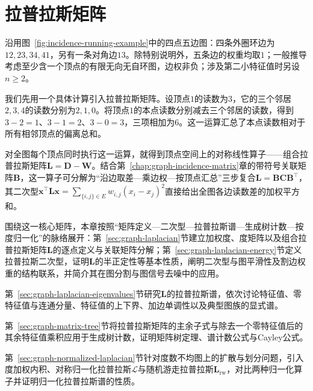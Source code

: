 \chapter{拉普拉斯矩阵}
\label{chap:graph-laplacian-matrix}

沿用图~\ref{fig:incidence-running-example}中的四点五边图：四条外圈环边为$12,23,34,41$，另有一条对角边$13$。除特别说明外，五条边的权重均取$1$；一般推导考虑至少含一个顶点的有限无向无自环图，边权非负；涉及第二小特征值时另设$n\geq2$。

我们先用一个具体计算引入拉普拉斯矩阵。设顶点$1$的读数为$3$，它的三个邻居$2,3,4$的读数分别为$2,1,0$。将顶点$1$的本点读数分别减去三个邻居的读数，得到$3-2=1$、$3-1=2$、$3-0=3$，三项相加为$6$。这一运算汇总了本点读数相对于所有相邻顶点的偏离总和。

对全图每个顶点同时执行这一运算，就得到顶点空间上的对称线性算子——组合拉普拉斯矩阵$\bm L=\bm D-\bm W$。结合第~\ref{chap:graph-incidence-matrix}章的带符号关联矩阵$\bm B$，这一算子可分解为“沿边取差—乘边权—按顶点汇总”三步复合$\bm L=\bm B\bm C\bm B^\top$，其二次型$\bm x^\top\bm L\bm x=\sum_{\{i,j\}\in E}w_{i,j}(x_i-x_j)^2$直接给出全图各边读数差的加权平方和。

围绕这一核心矩阵，本章按照“矩阵定义—二次型—拉普拉斯谱—生成树计数—按度归一化”的脉络展开：第~\ref{sec:graph-laplacian}节建立加权度、度矩阵以及组合拉普拉斯矩阵$\bm L$的逐点定义与关联矩阵分解；第~\ref{sec:graph-laplacian-energy}节定义拉普拉斯二次型，证明$\bm L$的半正定性等基本性质，阐明二次型与图平滑性及割边权重的结构联系，并简介其在图分割与图信号去噪中的应用。

第~\ref{sec:graph-laplacian-eigenvalues}节研究$\bm L$的拉普拉斯谱，依次讨论特征值、零特征值与连通分量、特征值的上下界、加边单调性以及典型图族的显式谱。

第~\ref{sec:graph-matrix-tree}节将拉普拉斯矩阵的主余子式与除去一个零特征值后的其余特征值乘积应用于生成树计数，证明矩阵树定理、谱计数公式与Cayley公式。

第~\ref{sec:graph-normalized-laplacian}节针对度数不均图上的扩散与划分问题，引入度加权内积、对称归一化拉普拉斯$\mathcal L$与随机游走拉普拉斯$\bm L_{\mathrm{rw}}$，对比两种归一化算子并证明归一化拉普拉斯谱的性质。






